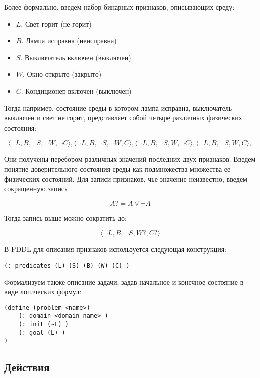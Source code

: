 Более формально, введем набор бинарных признаков, описывающих среду:

\begin{itemize}
\item
  $L$. Свет горит (не горит)
\item
  $B$. Лампа исправна (неисправна)
\item
  $S$. Выключатель включен (выключен)
\item
  $W$. Окно открыто (закрыто)
\item
  $C$. Кондиционер включен (выключен)
\end{itemize}

Тогда например, состояние среды в котором лампа исправна, выключатель
выключен и свет не горит, представляет собой четыре различных физических
состояния:

\begin{equation}\langle \neg L, B, \neg S, \neg W, \neg C\rangle, \langle \neg L, B, \neg S, \neg W, C\rangle, \langle \neg L, B, \neg S, W, \neg C\rangle, \langle \neg L, B, \neg S, W, C\rangle,\end{equation}

Они получены перебором различных значений последних двух признаков.
Введем понятие доверительного состояния среды как подмножества множества
ее физических состояний. Для записи признаков, чье значение неизвестно,
введем сокращенную запись

\begin{equation}A?=A \lor \neg A\end{equation}

Тогда запись выше можно сократить до:

\begin{equation}\langle \neg L, B, \neg S, W?, C?\rangle\end{equation}

В PDDL для описания признаков используется следующая конструкция:

\begin{verbatim}
(: predicates (L) (S) (B) (W) (C) )
\end{verbatim}

Формализуем также описание задачи, задав начальное и конечное состояние
в виде логических формул:

\begin{verbatim}
(define (problem <name>)
    (: domain <domain_name> )
    (: init (~L) )
    (: goal (L) )
)
\end{verbatim}

\subsection{Действия}

